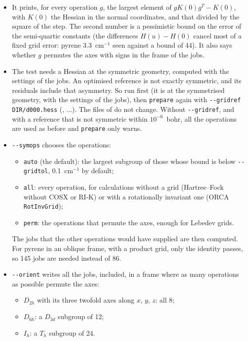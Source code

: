 \begin{itemize}
\item It prints, for every operation $g$, the largest element of
  $g K(0) g^T - K(0)$, with $K(0)$ the Hessian in the normal
  coordinates, and that divided by the square of the step. The second
  number is a pessimistic bound on the error of the semi-quartic
  constants (the differences $H(u) - H(0)$ cancel most of a fixed grid
  error: pyrene 3.3~cm$^{-1}$ seen against a bound of 44). It also says
  whether $g$ permutes the axes with signs in the frame of the jobs.
\item The test needs a Hessian at the symmetric geometry, computed with
  the settings of the jobs. An optimised reference is not exactly
  symmetric, and its residuals include that asymmetry. So run
   first (it is at the symmetrised geometry, with the
  settings of the jobs), then \texttt{prepare} again with
  \texttt{-{}-gridref DIR/d000.hess} (, ...). The files of
   do not change. Without \texttt{-{}-gridref}, and with a
  reference that is not symmetric within $10^{-6}$~bohr, all the
  operations are used as before and \texttt{prepare} only warns.
\item \texttt{-{}-symops} chooses the operations:
  \begin{itemize}
  \item \texttt{auto} (the default): the largest subgroup of those whose
    bound is below \texttt{-{}-gridtol}, 0.1~cm$^{-1}$ by default;
  \item \texttt{all}: every operation, for calculations without a grid
    (Hartree--Fock without COSX or RI-K) or with a rotationally
    invariant one (ORCA \texttt{RotInvGrid});
  \item \texttt{perm}: the operations that permute the axes, enough for
    Lebedev grids.
  \end{itemize}
  The jobs that the other operations would have supplied are then
  computed. For pyrene in an oblique frame, with a product grid, only
  the identity passes, so 145 jobs are needed instead of 86.
\item \texttt{-{}-orient} writes all the jobs,  included, in a
  frame where as many operations as possible permute the axes:
  \begin{itemize}
  \item $D_{2h}$ with its three twofold axes along $x$, $y$, $z$: all 8;
  \item $D_{6h}$: a $D_{3d}$ subgroup of 12;
  \item $I_h$: a $T_h$ subgroup of 24.

\end{itemize}
\end{itemize}
